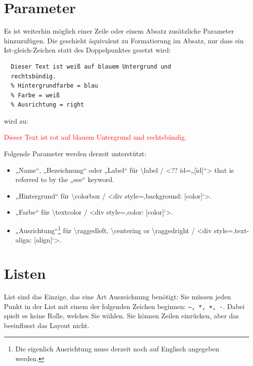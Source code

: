 \documentclass{scrartcl}
\begin{document}
\section{Parameter}

{Es ist weiterhin möglich einer Zeile oder einem Absatz
zusätzliche Parameter hinzuzufügen. Die geschieht äquivalent
zu Formatierung im Absatz, nur dass ein Ist-gleich-Zeichen
statt des Doppelpunktes gesetzt wird:\\}

\begin{verbatim}
  Dieser Text ist weiß auf blauem Untergrund und
  rechtsbündig.
  % Hintergrundfarbe = blau
  % Farbe = weiß
  % Ausrichtung = right
\end{verbatim}


{wird zu:\\}

\colorbox{PaleTurquoise1}{\parbox{\linewidth}{%
{\raggedleft%
\textcolor{red}{%
Dieser Text ist rot auf blauem Untergrund und
rechtsbündig.}\\}
}
}

{Folgende Parameter werden derzeit unterstützt:\\}

\begin{itemize}
\item „Name“, „Bezeichnung“ oder  „Label“ für \textbackslash label / <?? id=„{[id]}“> that is
  referred to by the „see“ keyword.
\item „Hintergrund“ für \textbackslash colorbox / <div style=‚background: {[color]}‘>.
\item „Farbe“ für \textbackslash textcolor / <div style=‚color: {[color]}‘>.
\item „Ausrichtung“\footnote{Die eigenlich Ausrichtung muss derzeit noch auf Englisch angegeben werden.}\xspace  für \textbackslash raggedleft, \textbackslash centering or \textbackslash raggedright / <div
  style=‚text-align: {[align]}‘>.
\end{itemize}


\section{Listen}

{List sind das Einzige, das eine Art Auszeichnung benötigt:
Sie müssen jeden Punkt in der List mit einem der folgenden
Zeichen beginnen: \texttt{–, *, +, -}. Dabei spielt es keine Rolle,
welches Sie wählen. Sie können Zeilen einrücken, aber das
beeinflusst das Layout nicht.\\}
\end{document}
